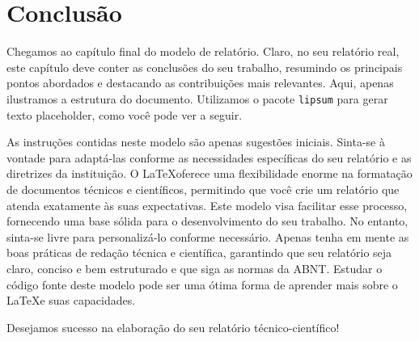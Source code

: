 \chapter{Conclusão}\label{cap:conclusao}

Chegamos ao capítulo final do modelo de relatório. Claro, no seu relatório real, este capítulo deve
conter as conclusões do seu trabalho, resumindo os principais pontos abordados e destacando as
contribuições mais relevantes. Aqui, apenas ilustramos a estrutura do documento. Utilizamos o pacote
\texttt{lipsum} para gerar texto placeholder, como você pode ver a seguir.

\lipsum[6-7]

As instruções contidas neste modelo são apenas sugestões iniciais. Sinta-se à vontade para
adaptá-las conforme as necessidades específicas do seu relatório e as diretrizes da instituição.
O \LaTeX oferece uma flexibilidade enorme na formatação de documentos técnicos e científicos,
permitindo que você crie um relatório que atenda exatamente às suas expectativas. Este modelo visa
facilitar esse processo, fornecendo uma base sólida para o desenvolvimento do seu trabalho. No
entanto, sinta-se livre para personalizá-lo conforme necessário. Apenas tenha em mente as boas
práticas de redação técnica e científica, garantindo que seu relatório seja claro, conciso e bem
estruturado e que siga as normas da ABNT. Estudar o código fonte deste modelo pode ser uma ótima
forma de aprender mais sobre o \LaTeX e suas capacidades.

Desejamos sucesso na elaboração do seu relatório técnico-científico!